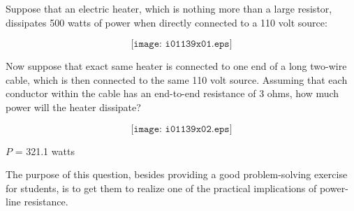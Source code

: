 

Suppose that an electric heater, which is nothing more than a large resistor, dissipates 500 watts of power when directly connected to a 110 volt source:

$$\texttt{[image: i01139x01.eps]}$$

Now suppose that exact same heater is connected to one end of a long two-wire cable, which is then connected to the same 110 volt source.  Assuming that each conductor within the cable has an end-to-end resistance of 3 ohms, how much power will the heater dissipate?

$$\texttt{[image: i01139x02.eps]}$$







$P$ = 321.1 watts







The purpose of this question, besides providing a good problem-solving exercise for students, is to get them to realize one of the practical implications of power-line resistance.




